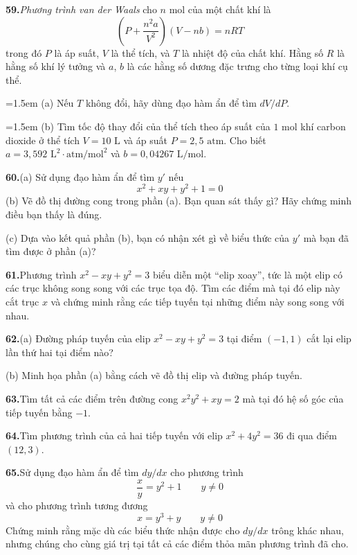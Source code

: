 \begin{minipage}[t]{0.485\textwidth}
\textbf{59.}\enspace \textit{Phương trình van der Waals} cho $n$ mol của một chất khí là
\[
\left( P + \frac{n^2 a}{V^2} \right)(V - nb) = nRT
\]
trong đó $P$ là áp suất, $V$ là thể tích, và $T$ là nhiệt độ của chất khí. Hằng số $R$ là hằng số khí lý tưởng và $a$, $b$ là các hằng số dương đặc trưng cho từng loại khí cụ thể.

\hangindent=1.5em (a) Nếu $T$ không đổi, hãy dùng đạo hàm ẩn để tìm $dV/dP$.

\hangindent=1.5em (b) Tìm tốc độ thay đổi của thể tích theo áp suất của $1\text{ mol}$ khí carbon dioxide ở thể tích $V = 10\text{ L}$ và áp suất $P = 2{,}5\text{ atm}$. Cho biết $a = 3{,}592\text{ L}^2\cdot\text{atm/mol}^2$ và $b = 0{,}04267\text{ L/mol}$.

\end{minipage}%
\hfill
\begin{minipage}[t]{0.485\textwidth}
\setlength{\parskip}{4.6pt}

\textbf{60.}\enspace (a) Sử dụng đạo hàm ẩn để tìm $y'$ nếu
\[
x^2 + xy + y^2 + 1 = 0
\]
\makebox[0pt][r]{\casicon\hspace{4pt}}(b) Vẽ đồ thị đường cong trong phần (a). Bạn quan sát thấy gì? Hãy chứng minh điều bạn thấy là đúng.

(c) Dựa vào kết quả phần (b), bạn có nhận xét gì về biểu thức của $y'$ mà bạn đã tìm được ở phần (a)?

\textbf{61.}\enspace Phương trình $x^2 - xy + y^2 = 3$ biểu diễn một “elip xoay”, tức là một elip có các trục không song song với các trục tọa độ. Tìm các điểm mà tại đó elip này cắt trục $x$ và chứng minh rằng các tiếp tuyến tại những điểm này song song với nhau.

\textbf{62.}\enspace (a) Đường pháp tuyến của elip $x^2 - xy + y^2 = 3$ tại điểm $(-1, 1)$ cắt lại elip lần thứ hai tại điểm nào?

\makebox[0pt][r]{\casicon\hspace{4pt}}(b) Minh họa phần (a) bằng cách vẽ đồ thị elip và đường pháp tuyến.

\textbf{63.}\enspace Tìm tất cả các điểm trên đường cong $x^2 y^2 + xy = 2$ mà tại đó hệ số góc của tiếp tuyến bằng $-1$.

\textbf{64.}\enspace Tìm phương trình của cả hai tiếp tuyến với elip $x^2 + 4y^2 = 36$ đi qua điểm $(12, 3)$.

\textbf{65.}\enspace Sử dụng đạo hàm ẩn để tìm $dy/dx$ cho phương trình
\[
\frac{x}{y} = y^2 + 1 \qquad y \ne 0
\]
và cho phương trình tương đương
\[
x = y^3 + y \qquad y \ne 0
\]
Chứng minh rằng mặc dù các biểu thức nhận được cho $dy/dx$ trông khác nhau, nhưng chúng cho cùng giá trị tại tất cả các điểm thỏa mãn phương trình đã cho.


\end{minipage}
